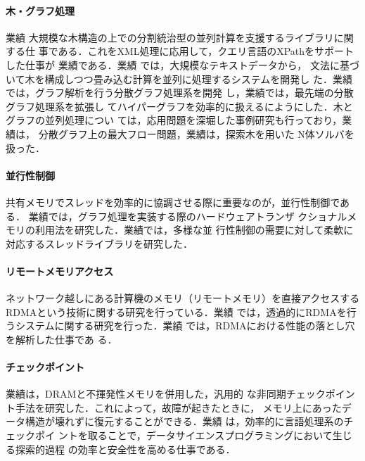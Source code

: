\documentclass[dvipdfmx]{jsarticle}
\begin{document}
\paragraph{木・グラフ処理}
業績\cite{ijpp16:tree_skel,jssst16:nbody_locality,jssst14:par_traversal}
大規模な木構造の上での分割統治型の並列計算を支援するライブラリに関する仕
事である．これをXML処理に応用して，クエリ言語のXPathをサポートした仕事が
業績\cite{adbis18:par_xpath,cloudcomp20:xpath}である．業績
\cite{pro19o:centaurus,jip20:centaurus}では，大規模なテキストデータから，
文法に基づいて木を構成しつつ畳み込む計算を並列に処理するシステムを開発し
た．業績\cite{fhpc16:s6raph}では，グラフ解析を行う分散グラフ処理系を開発
し，業績\cite{jip21:hyper_gemini}では，最先端の分散グラフ処理系を拡張し
てハイパーグラフを効率的に扱えるにようにした．木とグラフの並列処理につい
ては，応用問題を深堀した事例研究も行っており，業績\cite{ngc18:pregel}は，
分散グラフ上の最大フロー問題，業績\cite{ispass22:vipp}は，探索木を用いた
N体ソルバを扱った．

\paragraph{並行性制御}
共有メモリでスレッドを効率的に協調させる際に重要なのが，並行性制御である．
業績\cite{icpp15:htm}では，グラフ処理を実装する際のハードウェアトランザ
クショナルメモリの利用法を研究した．業績\cite{icpp15:htm}では，多様な並
行性制御の需要に対して柔軟に対応するスレッドライブラリを研究した．

\paragraph{リモートメモリアクセス}
ネットワーク越しにある計算機のメモリ（リモートメモリ）を直接アクセスする
RDMAという技術に関する研究を行っている．業績
\cite{ipdrm20:menps,jip22:argodsm,pro22o:far_memory,ppl23c3:far_memory,ppl23c3:redn}
では，透過的にRDMAを行うシステムに関する研究を行った．業績
\cite{ispass21:ib_odp}では，RDMAにおける性能の落とし穴を解析した仕事であ
る．

\paragraph{チェックポイント}
業績\cite{jssst22:checkpoint}は，DRAMと不揮発性メモリを併用した，汎用的
な非同期チェックポイント手法を研究した．これによって，故障が起きたときに，
メモリ上にあったデータ構造が壊れずに復元することができる．業績
\cite{splash22:mvnb,ppl23:notebook}は，効率的に言語処理系のチェックポイ
ントを取ることで，データサイエンスプログラミングにおいて生じる探索的過程
の効率と安全性を高める仕事である．
\end{document}
